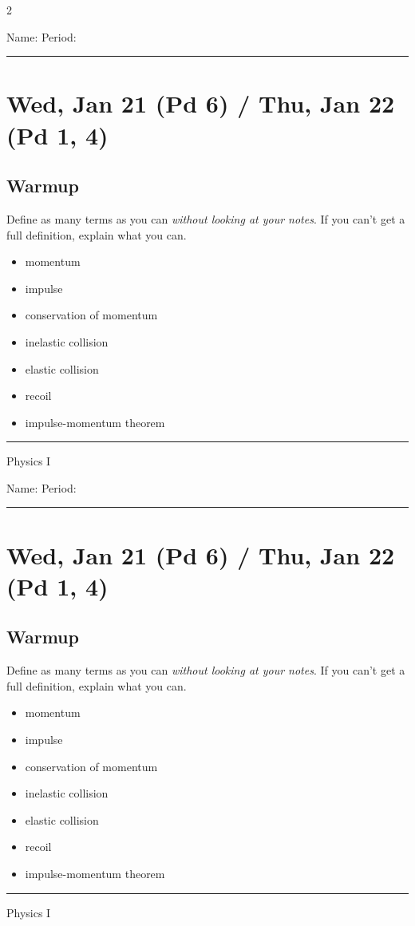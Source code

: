 \documentclass[10pt,landscape]{exam}
\def\todayDate{Wed, Jan 21 (Pd 6) / Thu, Jan 22 (Pd 1, 4)}
\def\content{


Define as many terms as you can \emph{without looking at your notes}.  If you can't get a full definition, explain what you can.

\begin{itemize}
  \item momentum \vs
  \item impulse \vs 
  \item conservation of momentum \vs
  \item inelastic collision \vs 
  \item elastic collision \vs 
  \item recoil \vs 
  \item impulse-momentum theorem \vs
\end{itemize}

}
\begin{document}
\pagestyle{empty}

\setlength{\columnsep}{0.8in}
\begin{multicols*}{2}

\noindent  
Name: \hfill Period: \hspace{5em}
\vspace{0.5em}
\hrule

\section*{\todayDate}
\subsection*{Warmup}

\content

\vfill
\hrule
\vspace{0.5em}
\hfill {\sc Physics I}

\columnbreak

\noindent  
Name: \hfill Period: \hspace{5em}
\vspace{0.5em}
\hrule

\section*{\todayDate}
\subsection*{Warmup}

\content

\vfill
\hrule
\vspace{0.5em}
\hfill {\sc Physics I}

\end{multicols*}
\end{document}
